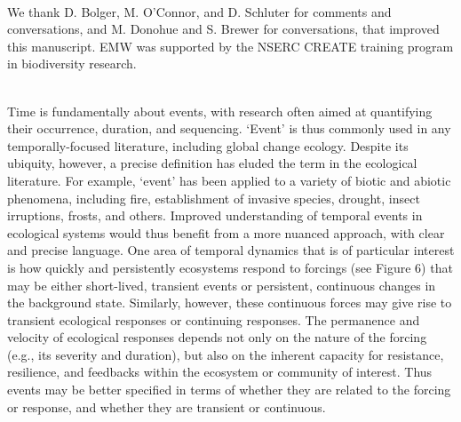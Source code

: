 \documentclass[11pt,a4paper,oneside]{article}
\begin{document}
\\
We thank D. Bolger, M. O'Connor, and D. Schluter for comments and conversations, and M. Donohue and S. Brewer for conversations, that improved this manuscript. EMW was supported by the NSERC CREATE training program in biodiversity research.  %


\newpage
{}\\ 
\noindent Time is fundamentally about events, with research often aimed at quantifying their occurrence, duration, and sequencing. `Event' is thus commonly used in any temporally-focused literature, including global change ecology. Despite its ubiquity, however, a precise definition has eluded the term in the ecological literature. For example, `event' has been applied to a variety of biotic and abiotic phenomena, including fire, establishment of invasive species, drought, insect irruptions, frosts, and others. Improved understanding of temporal events in ecological systems would thus benefit from a more nuanced approach, with clear and precise language. One area of temporal dynamics that is of particular interest is how quickly and persistently ecosystems respond to forcings (see Figure 6) that may be either short-lived, transient events or persistent, continuous changes in the background state. Similarly, however, these continuous forces may give rise to transient ecological responses or continuing responses. The permanence and velocity of ecological responses depends not only on the nature of the forcing (e.g., its severity and duration), but also on the inherent capacity for resistance, resilience, and feedbacks within the ecosystem or community of interest. Thus events may be better specified in terms of whether they are related to the forcing or response, and whether they are transient or continuous.\\
\end{document}
